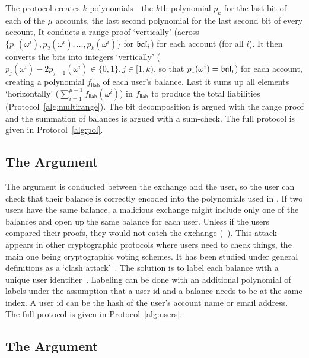 The protocol creates $k$ polynomials---the $k$th polynomial $p_k$ for the last bit of each of the $\mu$ accounts, the last second polynomial for the last second bit of every account, \etc It conducts a range proof `vertically' (across $\{p_1(\omega^i), p_2(\omega^i), \ldots, p_k(\omega^i)\}$ for $\mathfrak{bal}_i$) for each account (for all $i$). It then converts the bits into integers `vertically' ($p_j(\omega^i)-2p_{j+1}(\omega^i)\in\{0,1\},j\in[1,k)$, so that $p_1(\omega^i)=\mathfrak{bal}_i$)  for each account, creating a polynomial $f_\mathsf{liab}$ of each user's balance. Last it sums up all elements `horizontally' ($\sum_{i=1}^{\mu-1} f_\mathsf{liab}(\omega^i)$) in $f_\mathsf{liab}$ to produce the total liabilities (Protocol~\ref{alg:multirange}). The bit decomposition is argued with the range proof and the summation of balances is argued with a sum-check. The full protocol is given in Protocol~\ref{alg:pol}.




\subsection{The \userproof Argument}


The \userproof argument is conducted between the exchange and the user, so the user can check that their balance is correctly encoded into the polynomials used in \pol. If two users have the same balance, a malicious exchange might include only one of the balances and open up the same balance for each user. Unless if the users compared their proofs, they would not catch the exchange (\cf~\cite{broken}). This attack appears in other cryptographic protocols where users need to check things, the main one being cryptographic voting schemes. It has been studied under general definitions as a `clash attack'~\cite{clash}. The solution is to label each balance with a unique user identifier~\cite{provisions}. Labeling can be done with an additional polynomial of labels under the assumption that a user id and a balance needs to be at the same index. A user id can be the hash of the user's account name or email address.  The full protocol is given in Protocol~\ref{alg:users}.


\subsection{The \pos Argument}


